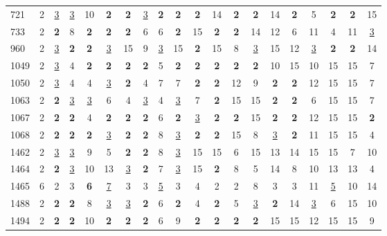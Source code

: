 \begin{tabular}{l c c c c c c c c c c c c c c c c c c c }
721 & 2 & \underline{3} & \underline{3} & 10 & \textbf{2} & \textbf{2} & \underline{3} & \textbf{2} & \textbf{2} & \textbf{2} & 14 & \textbf{2} & \textbf{2} & 14 & \textbf{2} & 5 & \textbf{2} & \textbf{2} & 15 \\
733 & 2 & \textbf{2} & 8 & \textbf{2} & \textbf{2} & \textbf{2} & 6 & 6 & \textbf{2} & 15 & \textbf{2} & \textbf{2} & 14 & 12 & 6 & 11 & 4 & 11 & \underline{3} \\
960 & 2 & \underline{3} & \textbf{2} & \textbf{2} & \underline{3} & 15 & 9 & \underline{3} & 15 & \textbf{2} & 15 & 8 & \underline{3} & 15 & 12 & \underline{3} & \textbf{2} & \textbf{2} & 14 \\
1049 & 2 & \underline{3} & 4 & \textbf{2} & \textbf{2} & \textbf{2} & \textbf{2} & 5 & \textbf{2} & \textbf{2} & \textbf{2} & \textbf{2} & \textbf{2} & 10 & 15 & 10 & 15 & 15 & 7 \\
1050 & 2 & \underline{3} & 4 & 4 & \underline{3} & \textbf{2} & 4 & 7 & 7 & \textbf{2} & \textbf{2} & 12 & 9 & \textbf{2} & \textbf{2} & 12 & 15 & 15 & 7 \\
1063 & 2 & \textbf{2} & \underline{3} & \underline{3} & 6 & 4 & \underline{3} & 4 & \underline{3} & 7 & \textbf{2} & 15 & 15 & \textbf{2} & \textbf{2} & 6 & 15 & 15 & 7 \\
1067 & 2 & \textbf{2} & \textbf{2} & 4 & \textbf{2} & \textbf{2} & \textbf{2} & 6 & \textbf{2} & \underline{3} & \textbf{2} & \textbf{2} & 15 & \textbf{2} & \textbf{2} & 12 & 15 & 15 & \textbf{2} \\
1068 & 2 & \textbf{2} & \textbf{2} & \textbf{2} & \underline{3} & \textbf{2} & \textbf{2} & 8 & \underline{3} & \textbf{2} & \textbf{2} & 15 & 8 & \underline{3} & \textbf{2} & 11 & 15 & 15 & 4 \\
1462 & 2 & \underline{3} & \underline{3} & 9 & 5 & \textbf{2} & \textbf{2} & 8 & \underline{3} & 15 & 15 & 6 & 15 & 13 & 14 & 15 & 15 & 7 & 10 \\
1464 & 2 & \textbf{2} & \underline{3} & 10 & 13 & \underline{3} & \textbf{2} & 7 & \underline{3} & 15 & \textbf{2} & 8 & 5 & 14 & 8 & 10 & 13 & 13 & 4 \\
1465 & 6 & 2 & 3 & \textbf{6} & \underline{7} & 3 & 3 & \underline{5} & 3 & 4 & 2 & 2 & 8 & 3 & 3 & 11 & \underline{5} & 10 & 14 \\
1488 & 2 & \textbf{2} & \textbf{2} & 8 & \underline{3} & \underline{3} & \textbf{2} & 6 & \textbf{2} & 4 & \textbf{2} & 5 & \underline{3} & \textbf{2} & 14 & \underline{3} & 6 & 15 & 10 \\
1494 & 2 & \textbf{2} & \textbf{2} & 10 & \textbf{2} & \textbf{2} & \textbf{2} & 6 & 9 & \textbf{2} & \textbf{2} & \textbf{2} & \textbf{2} & 15 & 15 & 12 & 15 & 15 & 9 \\

\end{tabular}
